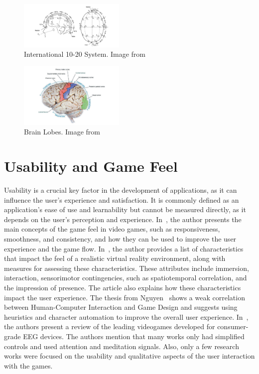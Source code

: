 \begin{figure}[htbp!]
    \centering
    \includegraphics[width=0.45\textwidth]{Figures/Related/international_10_20_system}
    \caption{International 10-20 System. Image from~\cite{luis2012brain}}\label{fig:international_10_20_system}
\end{figure}
\begin{figure}[htbp!]
    \centering
    \includegraphics[width=0.45\textwidth]{Figures/Related/brain_lobes}
    \caption{Brain Lobes. Image from~\cite{Harrison2015}}\label{fig:brain_lobes}
\end{figure}

\section{Usability and Game Feel}
Usability is a crucial key factor in the development of applications, as it can influence the user's experience and satisfaction.
It is commonly defined as an application's ease of use and learnability but cannot be measured directly, as it depends on the user's perception and experience.
In~\cite{swink2008game}, the author presents the main concepts of the game feel in video games, such as responsiveness, smoothness, and consistency, and how they can be used to improve the user experience and the game flow.
In~\cite{perez2018virtual}, the author provides a list of characteristics that impact the feel of a realistic virtual reality environment, along with measures for assessing these characteristics.
These attributes include immersion, interaction, sensorimotor contingencies, such as spatiotemporal correlation, and the impression of presence.
The article also explains how these characteristics impact the user experience. 
The thesis from Nguyen~\cite{nguyen2012human} shows a weak correlation between Human-Computer Interaction and Game Design and suggests using heuristics and character automation to improve the overall user experience.
In~\cite{doi:10.1080/10447318.2019.1612213}, the authors present a review of the leading videogames developed for consumer-grade EEG devices.
The authors mention that many works only had simplified controls and used attention and meditation signals. Also, only a few research works were focused on the usability and qualitative aspects of the user interaction with the games.

